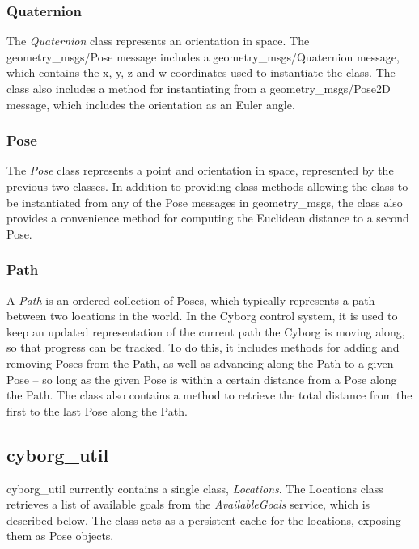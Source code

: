 \documentclass[\rootfolder/main.tex]{subfiles}
\begin{document}
\subsubsection{Quaternion}

The \emph{Quaternion} class represents an orientation in space.
The geometry\_msgs/Pose message includes a geometry\_msgs/Quaternion message, which contains the x, y, z and w coordinates used to instantiate the class.
The class also includes a method for instantiating from a geometry\_msgs/Pose2D message, which includes the orientation as an Euler angle.

\subsubsection{Pose}

The \emph{Pose} class represents a point and orientation in space, represented by the previous two classes.
In addition to providing class methods allowing the class to be instantiated from any of the Pose messages in geometry\_msgs, the class also provides a convenience method for computing the Euclidean distance to a second Pose.

\subsubsection{Path}

A \emph{Path} is an ordered collection of Poses, which typically represents a path between two locations in the world.
In the Cyborg control system, it is used to keep an updated representation of the current path the Cyborg is moving along, so that progress can be tracked.
To do this, it includes methods for adding and removing Poses from the Path, as well as advancing along the Path to a given Pose -- so long as the given Pose is within a certain distance from a Pose along the Path.
The class also contains a method to retrieve the total distance from the first to the last Pose along the Path.

\subsection{cyborg\_util}

cyborg\_util currently contains a single class, \emph{Locations}.
The Locations class retrieves a list of available goals from the \emph{AvailableGoals} service, which is described below.
The class acts as a persistent cache for the locations, exposing them as Pose objects.
\end{document}
